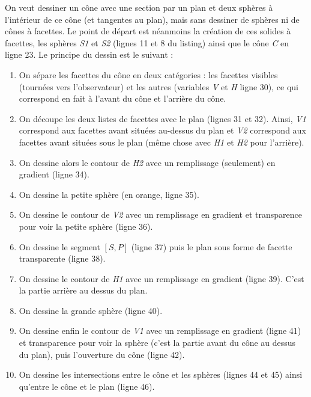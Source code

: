 On veut dessiner un cône avec une section par un plan et deux sphères à l'intérieur de ce cône (et tangentes au plan), mais sans dessiner de sphères ni de cônes à facettes. Le point de départ est néanmoins la création de ces solides à facettes, les sphères \emph{S1} et \emph{S2} (lignes 11 et 8 du listing) ainsi que le cône \emph{C} en ligne 23. Le principe du dessin est le suivant :
\begin{enumerate}
    \item On sépare les facettes du cône en deux catégories : les facettes visibles (tournées vers l'observateur) et les autres (variables \emph{V} et \emph{H} ligne 30), ce qui correspond en fait à l'avant du cône et l'arrière du cône.
    \item On découpe les deux listes de facettes avec le plan (lignes 31 et 32). Ainsi, \emph{V1} correspond aux facettes avant situées au-dessus du plan et \emph{V2} correspond aux facettes avant situées sous le plan (même chose avec \emph{H1} et \emph{H2} pour l'arrière).
    \item On dessine alors le contour de \emph{H2} avec un remplissage (seulement) en gradient (ligne 34).
    \item On dessine la petite sphère (en orange, ligne 35).
    \item On dessine le contour de \emph{V2} avec un remplissage en gradient et transparence pour voir la petite sphère  (ligne 36).
    \item On dessine le segment $[S,P]$ (ligne 37) puis le plan sous forme de facette transparente (ligne 38).
    \item On dessine le contour de \emph{H1} avec un remplissage en gradient (ligne 39). C'est la partie arrière au dessus du plan.
    \item On dessine la grande sphère (ligne 40).
    \item On dessine enfin le contour de \emph{V1} avec un remplissage en gradient (ligne 41) et transparence pour voir la sphère (c'est la partie avant du cône au dessus du plan), puis l'ouverture du cône (ligne 42).
    \item On dessine les intersections entre le cône et les sphères (lignes 44 et 45) ainsi qu'entre le cône et le plan (ligne 46).
\end{enumerate}

